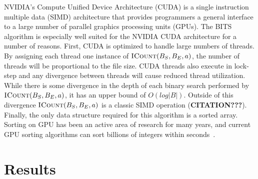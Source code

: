 \documentclass{bioinfo}
\begin{document}
        NVIDIA's Compute Unified Device Architecture (CUDA) is a single instruction
        multiple data (SIMD) architecture that provides programmers a general interface
        to a large number of parallel graphics processing units (GPUs).  The BITS
        algorithm is especially well suited for the NVIDIA CUDA architecture for a
        number of reasons.  First, CUDA is optimized to handle large numbers of
        threads.  By assigning each thread one instance of
        $\textsc{ICount}(B_S,B_E,a)$, the number of threads will be proportional to
        the file size.  CUDA threads also execute in lock-step and any divergence
        between threads will cause reduced thread utilization.  While there is some
        divergence in the depth of each binary search performed by
        $\textsc{ICount}(B_S,B_E,a)$, it has an upper bound of $O(log |B|)$.  Outside
        of this divergence $\textsc{ICount}(B_S,B_E,a)$ is a classic SIMD operation
        (\textbf{CITATION???}).
        Finally, the only data structure required for this algorithm is a sorted
        array.  Sorting on GPU has been an active area of research for many years, and
        current GPU sorting algorithms can sort billions of integers within
        seconds~\cite{merrill2011}.
        
        

        \section{Results}
        
\end{document}
